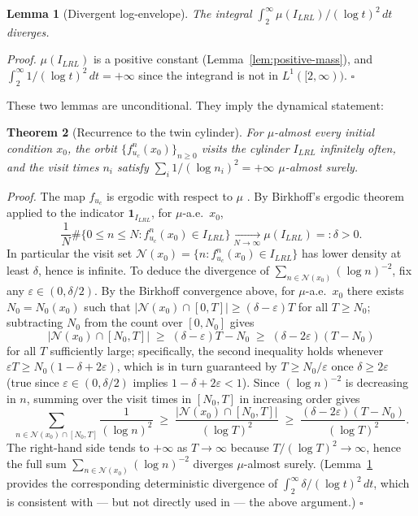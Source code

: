 \documentclass[cupthm,crop,info]{CUP-JNL-ETS}
\theoremstyle{cupplain}
\newtheorem{theorem}{Theorem}[section]
\newtheorem{lemma}[theorem]{Lemma}
\theoremstyle{cupdefinition}
\theoremstyle{cupremark}
\providecommand{\qed}{\hfill\(\square\)}
\newenvironment{proof}{\par\noindent\textit{Proof.}\quad}{\qed\par\medskip}
\numberwithin{equation}{section}
\begin{document}
\begin{lemma}[Divergent log-envelope]
\label{lem:divergent-envelope}
The integral $\int_2^\infty \mu(I_{LRL}) / (\log t)^2 \, dt$ diverges.
\end{lemma}
\begin{proof}
$\mu(I_{LRL})$ is a positive constant (Lemma~\ref{lem:positive-mass}),
and $\int_2^\infty 1/(\log t)^2 \, dt = +\infty$ since the integrand is
not in $L^1([2, \infty))$.
\end{proof}

These two lemmas are unconditional. They imply the dynamical statement:

\begin{theorem}[Recurrence to the twin cylinder]
\label{thm:dynamical-recurrence}
For $\mu$-almost every initial condition $x_0$, the orbit
$\{f_{u_c}^n(x_0)\}_{n \geq 0}$ visits the cylinder $I_{LRL}$ infinitely
often, and the visit times $n_i$ satisfy $\sum_i 1/(\log n_i)^2 = +\infty$
$\mu$-almost surely.
\end{theorem}
\begin{proof}
The map $f_{u_c}$ is ergodic with respect to $\mu$
\cite{misiurewicz1981absolutely}. By Birkhoff's ergodic theorem applied
to the indicator $\mathbf{1}_{I_{LRL}}$, for $\mu$-a.e.\ $x_0$,
\[
    \frac{1}{N} \#\{ 0 \leq n \leq N : f_{u_c}^n(x_0) \in I_{LRL} \}
    \xrightarrow[N \to \infty]{} \mu(I_{LRL}) =: \delta > 0.
\]
In particular the visit set
$\mathcal{N}(x_0) = \{ n : f_{u_c}^n(x_0) \in I_{LRL}\}$ has lower
density at least $\delta$, hence is infinite. To deduce the divergence
of $\sum_{n \in \mathcal{N}(x_0)} (\log n)^{-2}$, fix any
$\varepsilon \in (0, \delta/2)$. By the Birkhoff convergence above,
for $\mu$-a.e.\ $x_0$ there exists $N_0 = N_0(x_0)$ such that
$|\mathcal{N}(x_0) \cap [0, T]| \geq (\delta - \varepsilon) T$ for all
$T \geq N_0$; subtracting $N_0$ from the count over $[0, N_0]$ gives
\[
    |\mathcal{N}(x_0) \cap [N_0, T]|
    \;\geq\; (\delta - \varepsilon) T - N_0
    \;\geq\; (\delta - 2\varepsilon)(T - N_0)
\]
for all $T$ sufficiently large; specifically, the second inequality
holds whenever $\varepsilon T \geq N_0 (1 - \delta + 2\varepsilon)$,
which is in turn guaranteed by $T \geq N_0 / \varepsilon$ once
$\delta \geq 2\varepsilon$ (true since
$\varepsilon \in (0, \delta/2)$ implies $1 - \delta + 2\varepsilon < 1$).
Since $(\log n)^{-2}$ is decreasing in $n$, summing over the visit
times in $[N_0, T]$ in increasing order gives
\[
    \sum_{n \in \mathcal{N}(x_0) \cap [N_0, T]} \frac{1}{(\log n)^2}
    \;\geq\; \frac{|\mathcal{N}(x_0) \cap [N_0, T]|}{(\log T)^2}
    \;\geq\; \frac{(\delta - 2\varepsilon)(T - N_0)}{(\log T)^2}.
\]
The right-hand side tends to $+\infty$ as $T \to \infty$ because
$T / (\log T)^2 \to \infty$, hence the full sum
$\sum_{n \in \mathcal{N}(x_0)} (\log n)^{-2}$ diverges $\mu$-almost
surely. (Lemma~\ref{lem:divergent-envelope} provides the corresponding
deterministic divergence of $\int_2^\infty \delta / (\log t)^2 \, dt$,
which is consistent with --- but not directly used in --- the above
argument.)
\end{proof}
\end{document}
